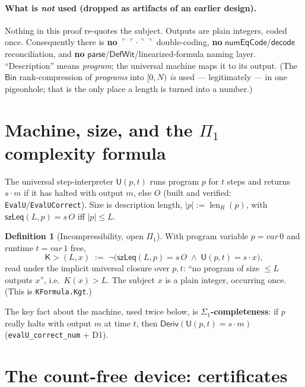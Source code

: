 \documentclass[11pt]{article}
\theoremstyle{plain}
\theoremstyle{definition}
\newtheorem{definition}[theorem]{Definition}
\theoremstyle{remark}
\newcommand{\code}[1]{\ulcorner #1 \urcorner}
\newcommand{\evalU}{\mathsf{U}}
\newcommand{\Kgt}{\mathsf{K{>}}}
\DeclareMathOperator{\len}{len}
\begin{document}
\paragraph{What is \emph{not} used (dropped as artifacts of an earlier design).}
Nothing in this proof re-quotes the subject. Outputs are plain integers, coded
once. Consequently there is \textbf{no} $\code{\code{\cdot}}$ double-coding, \textbf{no}
$\mathsf{numEqCode}$/$\mathsf{decode}$ reconciliation, and \textbf{no}
$\mathsf{parse}$/$\mathsf{DefWit}$/linearized-formula naming layer. ``Description''
means \emph{program}; the universal machine maps it to its output. (The $\mathsf{Bin}$
rank-compression of \emph{programs} into $[0,N)$ \emph{is} used --- legitimately ---
in one pigeonhole; that is the only place a length is turned into a number.)

\section{Machine, size, and the $\Pi_1$ complexity formula}

The universal step-interpreter $\evalU(p,t)$ runs program $p$ for $t$ steps and
returns $s\cdot m$ if it has halted with output $m$, else $O$ (built and verified:
\texttt{EvalU}/\texttt{EvalUCorrect}). Size is description length,
$|p| := \len_R(p)$, with $\mathsf{szLeq}(L,p) = s\,O$ iff $|p|\le L$.

\begin{definition}[Incompressibility, open $\Pi_1$]
With program variable $p=\mathit{var}\,0$ and runtime $t=\mathit{var}\,1$ free,
\[
  \Kgt(L,x) \;:=\; \neg\big(\mathsf{szLeq}(L,p)=s\,O \;\wedge\; \evalU(p,t)=s\cdot x\big),
\]
read under the implicit universal closure over $p,t$: ``no program of size $\le L$
outputs $x$'', i.e.\ $K(x)>L$. The subject $x$ is a plain integer, occurring once.
(This is \texttt{KFormula.Kgt}.)
\end{definition}

The key fact about the machine, used twice below, is \textbf{$\Sigma_1$-completeness}:
if $p$ really halts with output $m$ at time $t$, then $\mathsf{Deriv}(\evalU(p,t)=s\cdot m)$
(\texttt{evalU\_correct\_num} + D1).

\section{The count-free device: certificates}
\end{document}
